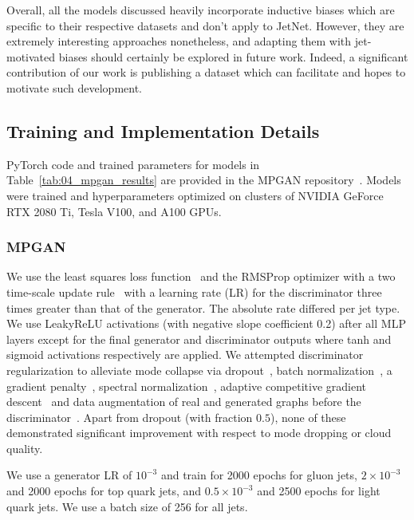 Overall, all the models discussed heavily incorporate inductive biases which are specific to their respective datasets and don't apply to JetNet.
However, they are extremely interesting approaches nonetheless, and adapting them with jet-motivated biases should certainly be explored in future work.
Indeed, a significant contribution of our work is publishing a dataset which can facilitate and hopes to motivate such development.

\subsection{Training and Implementation Details}
\label{app:04_mpgan_training}

PyTorch code and trained parameters for models in Table~\ref{tab:04_mpgan_results} are provided in the MPGAN repository~\cite{mpgancode}.
Models were trained and hyperparameters optimized on clusters of NVIDIA GeForce RTX 2080 Ti, Tesla V100, and A100 GPUs.

\subsubsection{MPGAN}

We use the least squares loss function~\cite{mao_lsgan} and the RMSProp optimizer with a two time-scale update rule~\cite{TTUR} with a learning rate (LR) for the discriminator three times greater than that of the generator. The absolute rate differed per jet type.
We use LeakyReLU activations (with negative slope coefficient 0.2) after all MLP layers except for the final generator and discriminator outputs where tanh and sigmoid activations respectively are applied.
We attempted discriminator regularization to alleviate mode collapse via dropout~\cite{srivastava2014dropout}, batch normalization~\cite{ioffe2015batch}, a gradient penalty~\cite{wgangp}, spectral normalization~\cite{spectralnorm}, adaptive competitive gradient descent~\cite{acgd} and data augmentation of real and generated graphs before the discriminator~\cite{karras_2020, tran_2020, zhao_2020}.
Apart from dropout (with fraction $0.5$), none of these demonstrated significant improvement with respect to mode dropping or cloud quality.

We use a generator LR of $10^{-3}$ and train for 2000 epochs for gluon jets, $2\times10^{-3}$ and 2000 epochs for top quark jets, and $0.5\times10^{-3}$ and 2500 epochs for light quark jets.
We use a batch size of 256 for all jets.

